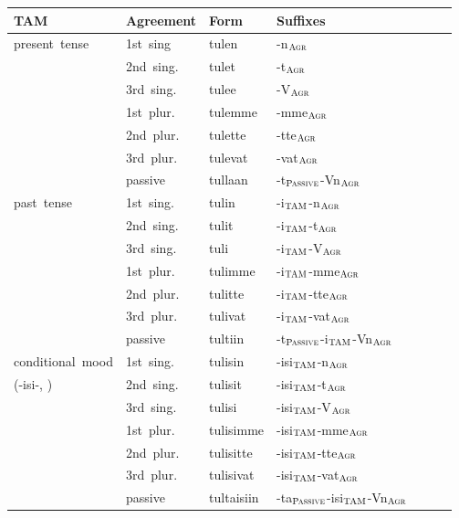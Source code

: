 \documentclass[11pt,letterpaper]{article}
\begin{document}
\begin{table}
\begin{tabular}{l|llllll}
	TAM & Agreement & Form & Suffixes \\ \hline\hline
	present tense & 	1st sing& 	tulen  & -n$_{\textsc{Agr}}$\\ 
	\cite[Section 24]{karlsson1999finnish}	&	2nd sing. 	& 	tulet  & -t$_{\textsc{Agr}}$\\ 
	&	3rd sing. 	& 	tulee  & -V$_{\textsc{Agr}}$\\                
	&	1st plur. 	& 	tulemme  &-mme$_{\textsc{Agr}}$\\ 
	&	2nd plur. 	& 	tulette  &-tte$_{\textsc{Agr}}$\\ 
	&	3rd plur. 	& 	tulevat  &-vat$_{\textsc{Agr}}$\\ 
	&	passive 	& 	tullaan  &-t$_{\textsc{Passive}}$-Vn$_{\textsc{Agr}}$ \\  \hline
past tense 	 	&	1st sing.& 	tulin & -i$_{\textsc{TAM}}$-n$_{\textsc{Agr}}$\\  
\cite[Section 60]{karlsson1999finnish}&	2nd sing. &	tulit  & -i$_{\textsc{TAM}}$-t$_{\textsc{Agr}}$\\ 
	&	3rd sing. &	tuli  & -i$_{\textsc{TAM}}$-V$_{\textsc{Agr}}$\\ 
	&	1st plur. &	tulimme  &-i$_{\textsc{TAM}}$-mme$_{\textsc{Agr}}$\\ 
	&	2nd plur. &	tulitte  &-i$_{\textsc{TAM}}$-tte$_{\textsc{Agr}}$\\ 
	&3rd plur. &	tulivat  & -i$_{\textsc{TAM}}$-vat$_{\textsc{Agr}}$\\ 
	&	passive &	tultiin  &-t$_{\textsc{Passive}}$-i$_{\textsc{TAM}}$-Vn$_{\textsc{Agr}}$ \\  \hline
conditional mood  &1st sing. &	tulisin  & -isi$_{\textsc{TAM}}$-n$_{\textsc{Agr}}$\\ 
	(-isi-, \cite[Section 65]{karlsson1999finnish})	&2nd sing. &	tulisit  & -isi$_{\textsc{TAM}}$-t$_{\textsc{Agr}}$\\ 
	&3rd sing. &	tulisi  & -isi$_{\textsc{TAM}}$-V$_{\textsc{Agr}}$\\ 
	&1st plur. &	tulisimme  & -isi$_{\textsc{TAM}}$-mme$_{\textsc{Agr}}$\\ 
	&2nd plur. &	tulisitte  & -isi$_{\textsc{TAM}}$-tte$_{\textsc{Agr}}$\\ 
	&3rd plur. &	tulisivat  & -isi$_{\textsc{TAM}}$-vat$_{\textsc{Agr}}$ \\ 
	&passive &	tultaisiin  & -ta$_{\textsc{Passive}}$-isi$_{\textsc{TAM}}$-Vn$_{\textsc{Agr}}$\\  \hline

\end{tabular}
\end{table}
\end{document}
